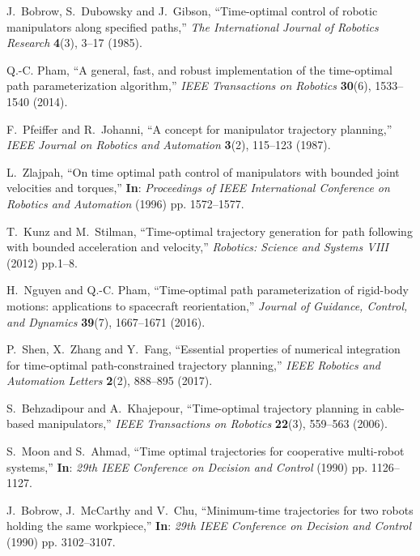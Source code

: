 \documentclass{rob}%
\begin{document}
\begin{thebibliography}{30}

J.~Bobrow, S.~Dubowsky and J.~Gibson, ``{Time-optimal control of robotic
	manipulators along specified paths},'' \emph{The International Journal of
	Robotics Research} \textbf{4}(3), 3--17 (1985).

Q.-C. Pham, ``{A general, fast, and robust implementation of the time-optimal
	path parameterization algorithm},'' \emph{IEEE Transactions on Robotics} \textbf{30}(6), 1533--1540 (2014).

F.~Pfeiffer and R.~Johanni, ``{A concept for manipulator trajectory
	planning},'' \emph{IEEE Journal on Robotics and Automation} \textbf{3}(2), 115--123 (1987).

L.~Zlajpah, ``{On time optimal path control of manipulators with bounded joint
	velocities and torques},'' \textbf{In}: \emph{Proceedings of IEEE International
	Conference on Robotics and Automation} (1996) pp. 1572--1577.

T.~Kunz and M.~Stilman, ``{Time-optimal trajectory generation for path
	following with bounded acceleration and velocity},'' \emph{Robotics:
	Science and Systems VIII} (2012) pp.1--8.

H.~Nguyen and Q.-C. Pham, ``{Time-optimal path parameterization of rigid-body
	motions: applications to spacecraft reorientation},'' \emph{{Journal of
		Guidance, Control, and Dynamics}} \textbf{39}(7), 1667--1671 (2016).

P.~Shen, X.~Zhang and Y.~Fang, ``{Essential properties of numerical
	integration for time-optimal path-constrained trajectory planning},''
\emph{IEEE Robotics and Automation Letters} \textbf{2}(2), 888--895 (2017).

S.~Behzadipour and A.~Khajepour, ``{Time-optimal trajectory planning in
	cable-based manipulators},'' \emph{IEEE Transactions on Robotics} \textbf{22}(3), 559--563 (2006).

S.~Moon and S.~Ahmad, ``{Time optimal trajectories for cooperative multi-robot
	systems},'' \textbf{In}: \emph{29th IEEE Conference on Decision and Control} (1990) pp. 1126--1127.

J.~Bobrow, J.~McCarthy and V.~Chu, ``{Minimum-time trajectories for two robots
	holding the same workpiece},'' \textbf{In}: \emph{29th IEEE Conference on Decision and
	Control} (1990) pp. 3102--3107.


\end{thebibliography}
\end{document}
